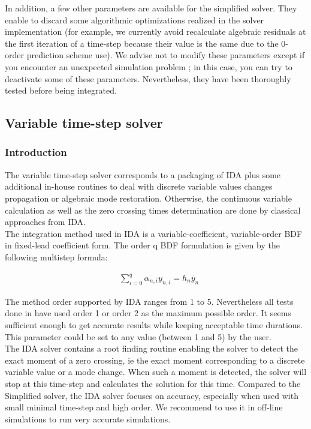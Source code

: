\documentclass[a4paper, 12pt]{report}
\begin{document}
In addition, a few other parameters are available for the simplified solver. They enable to discard some algorithmic optimizations realized in the solver implementation (for example, we currently avoid recalculate algebraic residuals at the first iteration of a time-step because their value is the same due to the 0-order prediction scheme use). We advise not to modify these parameters except if you encounter an unexpected simulation problem ; in this case, you can try to deactivate some of these parameters. Nevertheless, they have been thoroughly tested before being integrated.

\subsection{Variable time-step solver}

\subsubsection{Introduction}

The variable time-step solver corresponds to a packaging of \ac{IDA} plus some additional in-house routines to deal with discrete variable values changes propagation or algebraic mode restoration. Otherwise, the continuous variable calculation as well as the zero crossing times determination are done by classical approaches from \ac{IDA}. \\

The integration method used in \ac{IDA} is a variable-coefficient, variable-order \ac{BDF} in fixed-lead coefficient form. The order q BDF formulation is given by the following multistep formula:

\begin{equation}
\begin{aligned}
& \sum\limits_{i=0}^q \alpha_{n,i} y_{n,i} = h_{n}\dot{y_n}
\end{aligned}
\end{equation}

The method order supported by \ac{IDA} ranges from 1 to 5. Nevertheless all tests done in \Dynawo have used order 1 or order 2 as the maximum possible order. It seems sufficient enough to get accurate results while keeping acceptable time durations. This parameter could be set to any value (between 1 and 5) by the user. \\

The \ac{IDA} solver contains a root finding routine enabling the solver to detect the exact moment of a zero crossing, ie the exact moment corresponding to a discrete variable value or a mode change. When such a moment is detected, the solver will stop at this time-step and calculates the solution for this time. Compared to the Simplified solver, the \ac{IDA} solver focuses on accuracy, especially when used with small minimal time-step and high order.
We recommend to use it in off-line simulations to run very accurate simulations. \\
\end{document}
